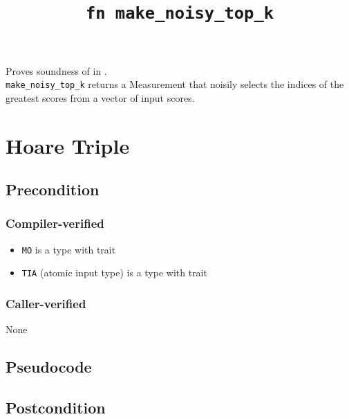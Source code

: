 \documentclass{article}
\title{\texttt{fn make\_noisy\_top\_k}}
\author{\MichaelShoemateAuthor}
\begin{document}
\maketitle

Proves soundness of 
in .\\
\texttt{make\_noisy\_top\_k} returns a Measurement that
noisily selects the indices of the greatest scores from a vector of input scores.

\section{Hoare Triple}
\subsection*{Precondition}
\subsubsection*{Compiler-verified}
\begin{itemize}
    \item \texttt{MO} is a type with trait 
    \item \texttt{TIA} (atomic input type) is a type with trait 
\end{itemize}

\subsubsection*{Caller-verified}
None

\subsection*{Pseudocode}
\label{sec:python-pseudocode}


\subsection*{Postcondition}

\begin{theorem}
    \label{postcondition}
\end{theorem}
\end{document}
